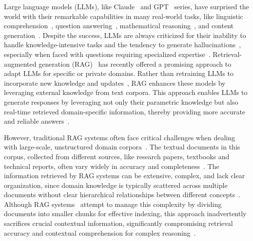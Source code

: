\documentclass{article} %
\begin{document}
Large language models (LLMs), like Claude~\citep{anthropic2024claude} and GPT~\citep{openai2023gpt4} series, have surprised the world with their remarkable capabilities in many real-world tasks, like linguistic comprehension~\citep{brown2020language}, question answering~\citep{khashabi2020unifiedqa}, mathematical reasoning~\citep{hong2025benchmarking}, and content generation~\citep{chowdhery2023palm,hong2024next,zhang2024structure}. 
Despite the success, LLMs are always criticized for their inability to handle knowledge-intensive tasks and the tendency to generate hallucinations~\citep{huang2023survey}, especially when faced with questions requiring specialized expertise~\citep{LLM4EA,he2024chineseqa, tan2024chineseqa}. 
Retrieval-augmented generation (RAG)~\citep{gao2023retrieval,lewis2020retrieval} has recently offered a promising approach to adapt LLMs for specific or private domains. Rather than retraining LLMs to incorporate new knowledge and updates~\citep{feng2025geoedit,fang2024alphaedit,jiang2025anyedit,wang2024knowledge,zhang2025faithfulrag}, RAG enhances these models by leveraging external knowledge from text corpora. This approach enables LLMs to generate responses by leveraging not only their parametric knowledge but also real-time retrieved domain-specific information, thereby providing more accurate and reliable answers~\citep{chen2024multi,li2024structrag}. 
 
However, traditional RAG systems often face critical challenges when dealing with large-scale, unstructured domain corpora~\citep{edge2024local,peng2024graph}. The textual documents in this corpus, collected from different sources, like research papers, textbooks and technical reports, often vary widely in accuracy and completeness~\citep{guo2025empowering}. The information retrieved by RAG systems can be extensive, complex, and lack clear organization, since domain knowledge is typically scattered across multiple documents without clear hierarchical relationships between different concepts~\citep{sun2024thinkongraph,zhang2024knowgpt,ma2024think-on-graph-2.0}. Although RAG systems~\citep{borgeaud2022improving,izacard2023atlas,jiang2023active} attempt to manage this complexity by dividing documents into smaller chunks for effective indexing, this approach inadvertently sacrifices crucial contextual information, significantly compromising retrieval accuracy and contextual comprehension for complex reasoning~\citep{han2024retrieval,zhang2025survey,difflogic}. 
\end{document}
